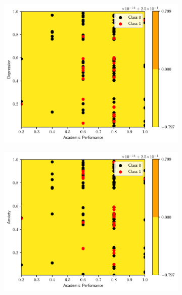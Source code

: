 \begin{figure}
  \begin{subfigure}[b]{0.32\textwidth}
    \centering \includegraphics[width=\textwidth]{figs/tree-contour-1-3.pdf}
    \caption{}
  \end{subfigure}
  \begin{subfigure}[b]{0.32\textwidth}
    \centering \includegraphics[width=\textwidth]{figs/tree-contour-1-4.pdf}
    \caption{}
  \end{subfigure}
  \begin{subfigure}[b]{0.32\textwidth}

\end{subfigure}
\end{figure}
